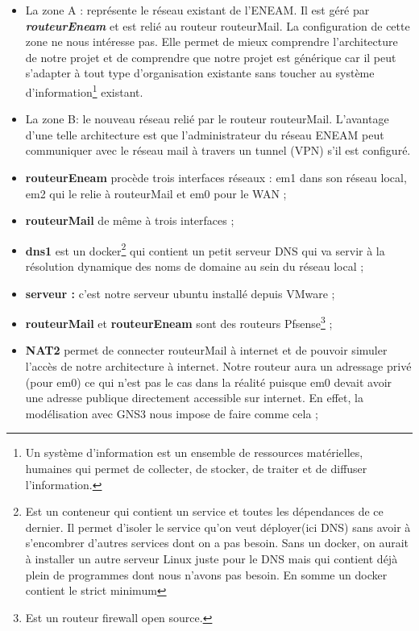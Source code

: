 \documentclass[a4paper,12pt,french]{report} %
\begin{document}
\begin{itemize}
\item La zone A : représente le réseau existant de l'ENEAM. Il est géré par \emph{\textbf{routeurEneam}} et est relié au routeur routeurMail. La configuration de cette zone ne nous intéresse pas. Elle permet de mieux comprendre l'architecture de notre projet et de comprendre que notre projet est générique car il peut s'adapter à tout type d'organisation existante sans toucher au système d'information\footnote{ Un système d'information est un ensemble de ressources matérielles, humaines qui permet de collecter, de stocker, de traiter et de diffuser l'information.} existant.
\item La zone B: le nouveau réseau relié par le routeur routeurMail.
L'avantage d'une telle architecture est que l'administrateur du réseau ENEAM peut communiquer avec le réseau mail à travers un tunnel (VPN) s'il est configuré.
\item \textbf{routeurEneam} procède trois interfaces réseaux : em1 dans son réseau local, em2 qui le relie à routeurMail et em0 pour le WAN ;
\item \textbf{routeurMail} de même à trois interfaces ;
\item \textbf{dns1} est un docker\footnote{Est un conteneur qui contient un service et toutes les dépendances de ce dernier. Il permet d'isoler le service qu'on veut déployer(ici DNS) sans avoir à s'encombrer d'autres services dont on a pas besoin. Sans un docker, on aurait à installer un autre serveur Linux juste pour le DNS mais qui contient déjà plein de programmes dont nous n'avons  pas besoin. En somme un docker contient le strict minimum} qui contient un petit serveur DNS qui va servir à la résolution dynamique des noms de domaine au sein du réseau local ;
\item \textbf{serveur :} c'est notre serveur ubuntu installé depuis VMware ;
\item \textbf{routeurMail} et \textbf{routeurEneam} sont des routeurs Pfsense\footnote{Est un routeur firewall open source.} ;
\item \textbf{NAT2} permet de connecter routeurMail à internet et de pouvoir simuler l'accès de notre architecture à internet. Notre routeur aura un adressage privé (pour em0) ce qui n'est pas le cas dans la réalité puisque em0 devait avoir une adresse publique directement accessible sur internet. En effet, la modélisation avec GNS3 nous impose de faire comme cela ;
\end{itemize}
\end{document}
